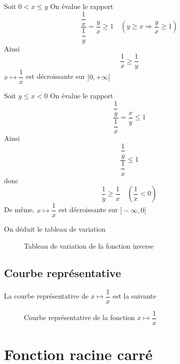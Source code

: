 \begin{preuve}
Soit $0 < x \leq y$\newline
On évalue le rapport 
$$\dfrac{\dfrac{1}{x}}{\dfrac{1}{y}} = \dfrac{y}{x} \geq 1 \quad (y \geq x \Rightarrow \dfrac{y}{x} \geq 1)$$
Ainsi 
$$\dfrac{1}{x} \geq \dfrac{1}{y}$$
$x\mapsto \dfrac{1}{x}$ est décroissante sur $]0,+\infty[$\newline


Soit $y \leq x < 0$ \newline
On évalue le rapport 
$$\dfrac{\dfrac{1}{y}}{\dfrac{1}{x}} = \dfrac{x}{y} \leq 1$$
Ainsi 
$$\dfrac{\dfrac{1}{y}}{\dfrac{1}{x}} \leq 1$$
donc 
$$\dfrac{1}{y} \geq \dfrac{1}{x} \quad (\dfrac{1}{x} < 0)$$
De même, $x\mapsto \dfrac{1}{x}$ est décroissante sur $]-\infty,0[$
\end{preuve}
On déduit le tableau de variation \newline
\begin{figure}[H]
\centering
{}
\caption{Tableau de variation de la fonction inverse}
\end{figure}
\subsection{Courbe représentative}
La courbe représentative de $x\mapsto \dfrac{1}{x}$ est la suivante \newline
\begin{figure}[H]
\centering
{}
\caption{Courbe représentative de la fonction $x\mapsto \dfrac{1}{x}$}
\end{figure}
\section{Fonction racine carré}
